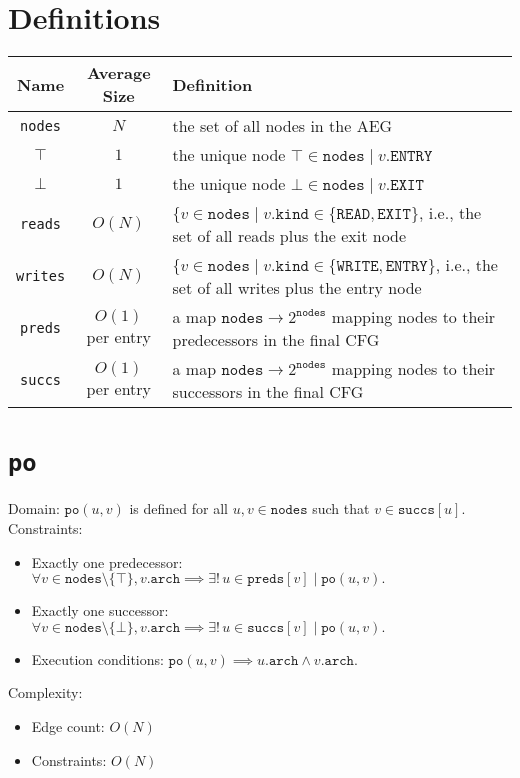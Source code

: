 \documentclass{article}
\newcommand{\kind}{\texttt{kind}}
\newcommand{\ENTRY}{\texttt{ENTRY}}
\newcommand{\EXIT}{\texttt{EXIT}}
\newcommand{\READ}{\texttt{READ}}
\newcommand{\WRITE}{\texttt{WRITE}}
\newcommand{\po}{\texttt{po}}
\newcommand{\preds}{\texttt{preds}}
\newcommand{\succs}{\texttt{succs}}
\newcommand{\nodes}{\texttt{nodes}}
\newcommand{\arch}{\texttt{arch}}
\newcommand{\writes}{\texttt{writes}}
\newcommand{\reads}{\texttt{reads}}
\begin{document}
\section{Definitions}
\begin{tabular}{|c|c|l|}\hline
  {\bf Name} & {\bf Average Size} & {\bf Definition} \\\hline
  \nodes    & $N$ & the set of all nodes in the AEG \\\hline
  $\top$    & $1$ & the unique node $\top \in \nodes \mid v.\ENTRY$ \\\hline
  $\bot$    & $1$ & the unique node $\bot \in \nodes \mid v.\EXIT$ \\\hline
  \reads    & $O(N)$ & $\{v \in \nodes \mid v.\kind \in \{\READ, \EXIT\}$, i.e., the set of all reads plus the exit node \\\hline
  \writes   & $O(N)$ & $\{v \in \nodes \mid v.\kind \in \{\WRITE, \ENTRY\}$, i.e., the set of all writes plus the entry node \\\hline
  \preds    & $O(1)$ per entry & a map $\nodes \to 2^\nodes$ mapping nodes to their predecessors in the final CFG \\\hline
  \succs  & $O(1)$ per entry  & a map $\nodes \to 2^\nodes$ mapping nodes to their successors in the final CFG \\\hline
\end{tabular}

\section{\po}

Domain: $\po(u,v)$ is defined for all $u,v \in \nodes$ such that $v \in \succs[u]$.
\\
Constraints:
\begin{itemize}
\item Exactly one predecessor:
  $\forall v \in \nodes \setminus \{\top\}, v.\arch \implies \exists!\, u \in \preds[v] \mid
  \po(u,v).$
\item Exactly one successor: $\forall v \in \nodes \setminus \{\bot\}, v.\arch \implies
  \exists!\, u \in \succs[v] \mid \po(u,v).$
\item Execution conditions: $\po(u,v) \implies u.\arch \wedge v.\arch.$
\end{itemize}
Complexity:
\begin{itemize}
\item Edge count: $O(N)$
\item Constraints: $O(N)$
\end{itemize}
\end{document}
